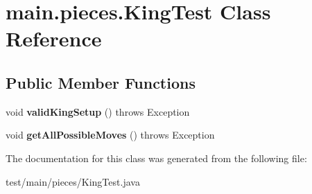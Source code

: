 \hypertarget{classmain_1_1pieces_1_1_king_test}{}\section{main.\+pieces.\+King\+Test Class Reference}
\label{classmain_1_1pieces_1_1_king_test}
\subsection*{Public Member Functions}
\begin{DoxyCompactItemize}
\item 
\mbox{\label{classmain_1_1pieces_1_1_king_test_af60b2546fb29c8e913346143d99c0ad1}} 
void {\bfseries valid\+King\+Setup} ()  throws Exception 
\item 
\mbox{\label{classmain_1_1pieces_1_1_king_test_ab70ff1f93a945ea4fdd05c8b52010a4f}} 
void {\bfseries get\+All\+Possible\+Moves} ()  throws Exception 
\end{DoxyCompactItemize}


The documentation for this class was generated from the following file\+:\begin{DoxyCompactItemize}
\item 
test/main/pieces/King\+Test.\+java\end{DoxyCompactItemize}
